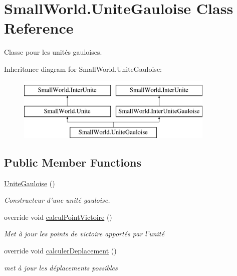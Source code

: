 \hypertarget{class_small_world_1_1_unite_gauloise}{\section{Small\-World.\-Unite\-Gauloise Class Reference}
\label{class_small_world_1_1_unite_gauloise}
}


Classe pour les unités gauloises.  


Inheritance diagram for Small\-World.\-Unite\-Gauloise\-:\begin{figure}[H]
\begin{center}
\leavevmode
\includegraphics[height=3.000000cm]{class_small_world_1_1_unite_gauloise}
\end{center}
\end{figure}
\subsection*{Public Member Functions}
\begin{DoxyCompactItemize}
\item 
\hyperlink{class_small_world_1_1_unite_gauloise_a4396b3209e57b49cbd042d661597627a}{Unite\-Gauloise} ()
\begin{DoxyCompactList}\small\item\em Constructeur d'une unité gauloise. \end{DoxyCompactList}\item 
\hypertarget{class_small_world_1_1_unite_gauloise_a180796f6111beaf93b018f2356c0e2e4}{override void \hyperlink{class_small_world_1_1_unite_gauloise_a180796f6111beaf93b018f2356c0e2e4}{calcul\-Point\-Victoire} ()}\label{class_small_world_1_1_unite_gauloise_a180796f6111beaf93b018f2356c0e2e4}

\begin{DoxyCompactList}\small\item\em Met à jour les points de victoire apportés par l'unité \end{DoxyCompactList}\item 
override void \hyperlink{class_small_world_1_1_unite_gauloise_a2fce92f8a4957a46efae89b63277b073}{calculer\-Deplacement} ()
\begin{DoxyCompactList}\small\item\em met à jour les déplacements possibles \end{DoxyCompactList}\end{DoxyCompactItemize}
